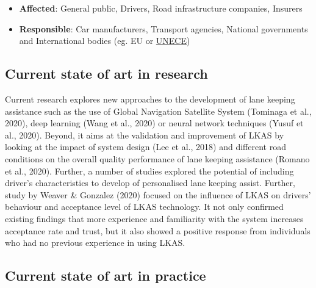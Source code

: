\documentclass[
]{book}
\providecommand{\tightlist}{%
  \setlength{\itemsep}{0pt}\setlength{\parskip}{0pt}}
\begin{document}
\begin{itemize}
\tightlist
\item
  \textbf{Affected}: General public, Drivers, Road infrastructure companies, Insurers
\item
  \textbf{Responsible}: Car manufacturers, Transport agencies, National governments and International bodies (eg. EU or \href{https://unece.org/fileadmin/DAM/trans/main/wp29/wp29regs/2018/R079r4e.pdf}{UNECE})
\end{itemize}

\hypertarget{current-state-of-art-in-research-25}{%
\subsection*{Current state of art in research}\label{current-state-of-art-in-research-25}}

Current research explores new approaches to the development of lane keeping assistance such as the use of Global Navigation Satellite System (Tominaga et al., 2020), deep learning (Wang et al., 2020) or neural network techniques (Yusuf et al., 2020). Beyond, it aims at the validation and improvement of LKAS by looking at the impact of system design (Lee et al., 2018) and different road conditions on the overall quality performance of lane keeping assistance (Romano et al., 2020). Further, a number of studies explored the potential of including driver's characteristics to develop of personalised lane keeping assist.
Further, study by Weaver \& Gonzalez (2020) focused on the influence of LKAS on drivers' behaviour and acceptance level of LKAS technology. It not only confirmed existing findings that more experience and familiarity with the system increases acceptance rate and trust, but it also showed a positive response from individuals who had no previous experience in using LKAS.

\hypertarget{current-state-of-art-in-practice-25}{%
\subsection*{Current state of art in practice}\label{current-state-of-art-in-practice-25}}
\end{document}
